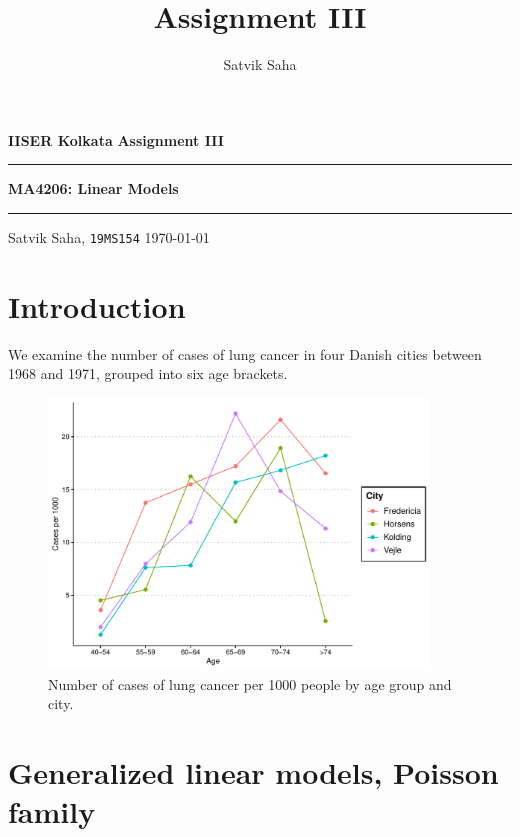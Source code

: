 \documentclass[10pt]{article}
\title{Assignment III}
\author{Satvik Saha}
\date{}
\begin{document}
    \noindent\textbf{IISER Kolkata} \hfill \textbf{Assignment III}
    \vspace{3pt}
    \hrule
    \vspace{3pt}
    \begin{center}
    \LARGE{\textbf{MA4206: Linear Models}}
    \end{center}
    \vspace{3pt}
    \hrule
    \vspace{3pt}
    Satvik Saha, \texttt{19MS154} \hfill \today
    \vspace{20pt}

    \setlength{\parskip}{1em}


    \section{Introduction}

    We examine the number of cases of lung cancer in four Danish cities between 1968
    and 1971, grouped into six age brackets.

    \begin{figure}[H]
    \begin{center}
        \vspace{1em}
        \includegraphics[width=0.9\textwidth]{plot_01.pdf}
    \end{center}
    \caption{
        Number of cases of lung cancer per 1000 people by age group and city.
    }
    \label{fig:danishlc}
    \end{figure}


    \section{Generalized linear models, Poisson family}
\end{document}
